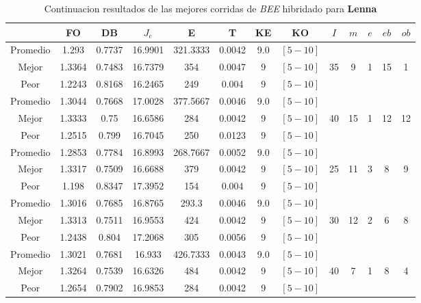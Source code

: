 \begin{table}[h!]
    \footnotesize
    \begin{center}
        \begin{tabular}{|c|c|c|c|c|c|c|c|c|c|c|c|c|}
        \hline
            & {\bf FO} & {\bf DB} & $J_e$ & {\bf E} & {\bf T} & {\bf KE} & {\bf KO} & $I$ & $m$ & $e$ & $eb$ & $ob$ \\
        \hline
        \hline
            Promedio  & 1.293 & 0.7737 & 16.9901 & 321.3333 & 0.0042 & 9.0 & $[5-10]$ &  &  &  &  & \\
            \cline{1-8}
            Mejor & 1.3364 & 0.7483  & 16.7379 & 354 & 0.0047 & 9 & $[5-10]$ & 35 & 9 & 1 & 15 & 1\\
            \cline{1-8}
            Peor & 1.2243 & 0.8168  & 16.2465 & 249 & 0.004 & 9 & $[5-10]$ &  &  &  &  & \\
        \hline
        \hline
            Promedio  & 1.3044 & 0.7668 & 17.0028 & 377.5667 & 0.0046 & 9.0 & $[5-10]$ &  &  &  &  & \\
            \cline{1-8}
            Mejor & 1.3333 & 0.75  & 16.6586 & 284 & 0.0042 & 9 & $[5-10]$ & 40 & 15 & 1 & 12 & 12\\
            \cline{1-8}
            Peor & 1.2515 & 0.799  & 16.7045 & 250 & 0.0123 & 9 & $[5-10]$ &  &  &  &  & \\
        \hline
        \hline
            Promedio  & 1.2853 & 0.7784 & 16.8993 & 268.7667 & 0.0052 & 9.0 & $[5-10]$ &  &  &  &  & \\
            \cline{1-8}
            Mejor & 1.3317 & 0.7509  & 16.6688 & 379 & 0.0042 & 9 & $[5-10]$ & 25 & 11 & 3 & 8 & 9\\
            \cline{1-8}
            Peor & 1.198 & 0.8347  & 17.3952 & 154 & 0.004 & 9 & $[5-10]$ &  &  &  &  & \\
        \hline
        \hline
            Promedio  & 1.3016 & 0.7685 & 16.8765 & 293.3 & 0.0046 & 9.0 & $[5-10]$ &  &  &  &  & \\
            \cline{1-8}
            Mejor & 1.3313 & 0.7511  & 16.9553 & 424 & 0.0042 & 9 & $[5-10]$ & 30 & 12 & 2 & 6 & 8\\
            \cline{1-8}
            Peor & 1.2438 & 0.804  & 17.2068 & 305 & 0.0056 & 9 & $[5-10]$ &  &  &  &  & \\
        \hline
        \hline
            Promedio  & 1.3021 & 0.7681 & 16.933 & 426.7333 & 0.0043 & 9.0 & $[5-10]$ &  &  &  &  & \\
            \cline{1-8}
            Mejor & 1.3264 & 0.7539  & 16.6326 & 484 & 0.0042 & 9 & $[5-10]$ & 40 & 7 & 1 & 8 & 4\\
            \cline{1-8}
            Peor & 1.2654 & 0.7902  & 16.9853 & 284 & 0.0042 & 9 & $[5-10]$ &  &  &  &  & \\
        \hline
        \end{tabular}
        \caption{Continuacion resultados de las mejores corridas de \emph{BEE} hibridado para {\bf Lenna}}
        \label{tb:tablebeehibimg}
    \end{center}
\end{table}
